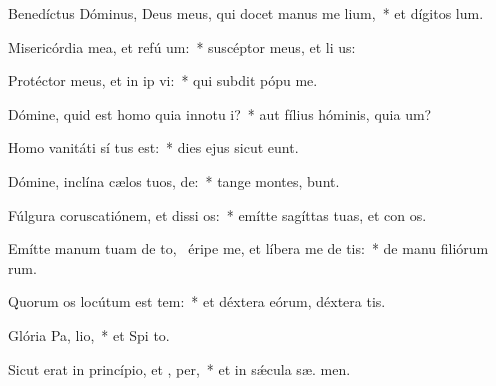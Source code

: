 \item Benedíctus Dóminus, Deus meus, qui docet manus me  lium,~* et dígitos   lum.
\item Misericórdia mea, et refú um:~* suscéptor meus, et li us:
\item Protéctor meus, et in ip vi:~* qui subdit pópu   me.
\item Dómine, quid est homo quia innotu i?~* aut fílius hóminis, quia  um?
\item Homo vanitáti sí tus est:~* dies ejus sicut  eunt.
\item Dómine, inclína cælos tuos,  de:~* tange montes,  bunt.
\item Fúlgura coruscatiónem, et dissi os:~* emítte sagíttas tuas, et con os.
\item Emítte manum tuam de to,~\pscross{} éripe me, et líbera me de  tis:~* de manu filiórum rum.
\item Quorum os locútum est tem:~* et déxtera eórum, déxtera tis.
\item Glória Pa,  lio,~* et Spi to.
\item Sicut erat in princípio, et ,  per,~* et in sǽcula sæ. men.
